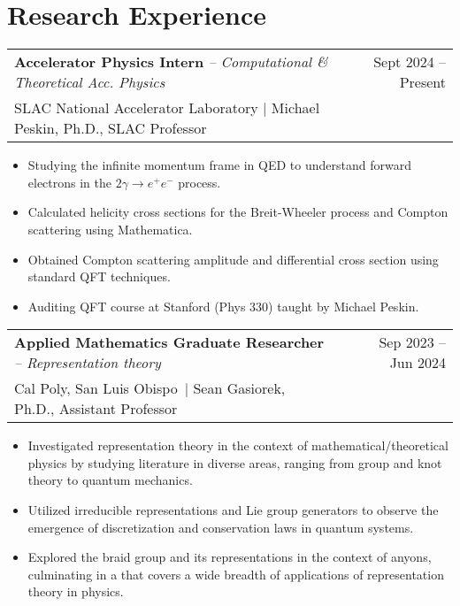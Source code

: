 \documentclass[a4paper,11pt]{article}
\makeatletter
\newcommand{\colhref}[3]{\href{#2}{\color{#1}{#3}}} %
\newenvironment{jobcustomlong}[4]
    {
    \begin{tabularx}{\linewidth}{@{}l X r@{}}
    \textbf{#1} \textit{#2} & \hfill &  #3 \\[-2.5pt]
    \textcolor{black!55!white}{\small #4} \\[2.5pt]
    \end{tabularx}
    \begin{minipage}[t]{\linewidth}
    \begin{itemize}[nosep,after=\strut, leftmargin=1.75em, itemsep=1pt,label={\small$\bullet$}]
    }
    {
    \end{itemize} \vspace{.325em}
    \end{minipage}   
    }
\newcommand{\calpoly}{\textcolor{black!55!white}{Cal Poly, San Luis Obispo}}
\makeatother
\begin{document}
\section{Research Experience} %
\begin{jobcustomlong}{Accelerator Physics Intern}{-- Computational \& Theoretical Acc. Physics}{Sept 2024 -- Present}{{SLAC} National Accelerator Laboratory $\vert$ Michael Peskin, Ph.D., SLAC Professor}
    \item Studying the infinite momentum frame in QED to understand forward electrons in the $2\gamma\to e^+e^-$ process.
    \item Calculated helicity cross sections for the Breit-Wheeler process and Compton scattering using Mathematica.
    \item Obtained Compton scattering amplitude and differential cross section using standard QFT techniques.
    \item Auditing QFT course at Stanford (Phys 330) taught by Michael Peskin.
\end{jobcustomlong}
\begin{jobcustomlong}{Applied Mathematics Graduate Researcher}{-- Representation theory}{Sep 2023 -- Jun 2024}{\calpoly\ $\vert$ Sean Gasiorek, Ph.D., Assistant Professor}
    \item Investigated representation theory in the context of mathematical/theoretical physics by studying literature in diverse areas, ranging from group and knot theory to quantum mechanics.
    \item Utilized irreducible representations and Lie group generators to observe the emergence of discretization and conservation laws in quantum systems.
    \item Explored the braid group and its representations in the context of anyons, culminating in a \colhref{blue!65!black}{https://digitalcommons.calpoly.edu/theses/2844/}{master's thesis} that covers a wide breadth of applications of representation theory in physics.
\end{jobcustomlong}
\end{document}
